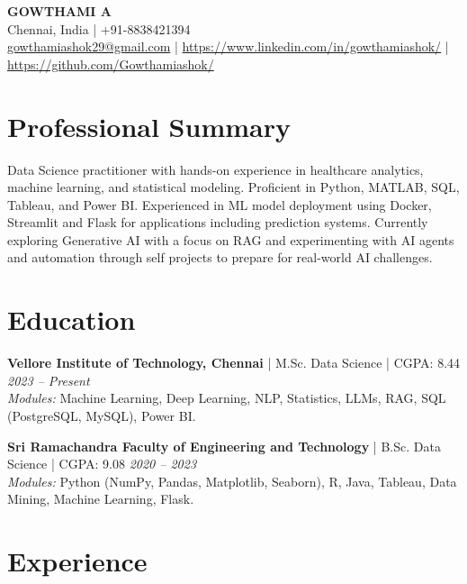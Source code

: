 \documentclass[a4paper,10pt]{article}
\begin{document}
\selectfont

\begin{center}
    {\Large \textbf{GOWTHAMI A}} \\[5pt]
    Chennai, India | +91-8838421394 \\
    
    \href{mailto:gowthamiashok29@gmail.com}{gowthamiashok29@gmail.com} |
    \href{https://www.linkedin.com/in/gowthamiashok/}{https://www.linkedin.com/in/gowthamiashok/} |
    \href{https://github.com/Gowthamiashok/}{https://github.com/Gowthamiashok/}
\end{center}


\vspace{-2mm}
\section{\textbf{Professional Summary}}
Data Science practitioner with hands-on experience in healthcare analytics, machine learning, and statistical modeling. Proficient in Python, MATLAB, SQL, Tableau, and Power BI.  Experienced in ML model deployment using Docker, Streamlit and Flask for applications including prediction systems. Currently exploring Generative AI with a focus on RAG and experimenting with AI agents and automation through self projects to prepare for real-world AI challenges.

\section{\textbf{Education}}

\noindent
\textbf{Vellore Institute of Technology, Chennai} | M.Sc. Data Science | CGPA: 8.44 \hfill \textit{2023 -- Present} \\
\textit{Modules:} Machine Learning, Deep Learning, NLP, Statistics, LLMs, RAG, SQL (PostgreSQL, MySQL), Power BI.

\vspace{0.1cm}
\noindent
\textbf{Sri Ramachandra Faculty of Engineering and Technology} | B.Sc. Data Science | CGPA: 9.08 \hfill \textit{2020 -- 2023} \\
\textit{Modules:} Python (NumPy, Pandas, Matplotlib, Seaborn), R, Java, Tableau, Data Mining, Machine Learning, Flask.


\section{\textbf{Experience}}
\end{document}

